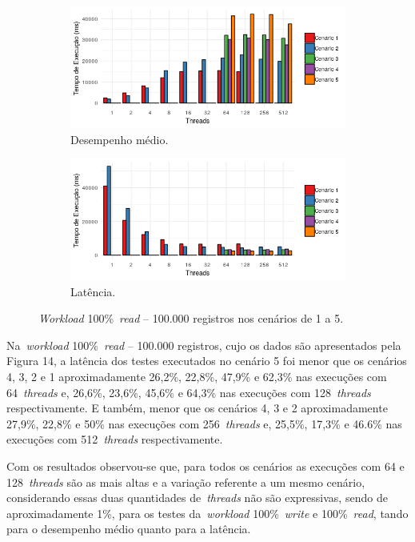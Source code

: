 \documentclass[12pt]{article}
\begin{document}
\begin{figure}
    \centering
    \begin{subfigure}[b]{0.49\textwidth}   
        \centering 
        \includegraphics[width=\textwidth]{images/figura13}
        \caption{Desempenho médio.}
        \label{figura13}
    \end{subfigure}
    \begin{subfigure}[b]{0.49\textwidth}   
        \centering 
        \includegraphics[width=\textwidth]{images/figura14}
        \caption{Latência.}
        \label{figura14}
    \end{subfigure}
    \caption{\emph{Workload} 100\%~\emph{read} -- 100.000 registros nos cenários de 1 a 5.}
\end{figure}

Na~\emph{workload} 100\%~\emph{read} -- 100.000 registros, cujo os dados são apresentados pela Figura 14, a latência dos testes executados no cenário 5 foi menor que os cenários 4, 3, 2 e 1 aproximadamente 26,2\%, 22,8\%, 47,9\% e 62,3\% nas execuções com 64~\emph{threads} e, 26,6\%, 23,6\%, 45,6\% e 64,3\% nas execuções com 128~\emph{threads} respectivamente. 
E também, menor que os cenários 4, 3 e 2 aproximadamente 27,9\%, 22,8\% e 50\% nas execuções com 256~\emph{threads} e, 25,5\%, 17,3\% e 46.6\% nas execuções com 512~\emph{threads} respectivamente.

Com os resultados observou-se que, para todos os cenários as execuções com 64 e 128~\emph{threads} são as mais altas e a variação referente a um mesmo cenário, considerando essas duas quantidades de~\emph{threads} não são expressivas, sendo de aproximadamente 1\%, para os testes da~\emph{workload} 100\%~\emph{write} e 100\%~\emph{read}, tando para o desempenho médio
quanto para a latência.
\end{document}
